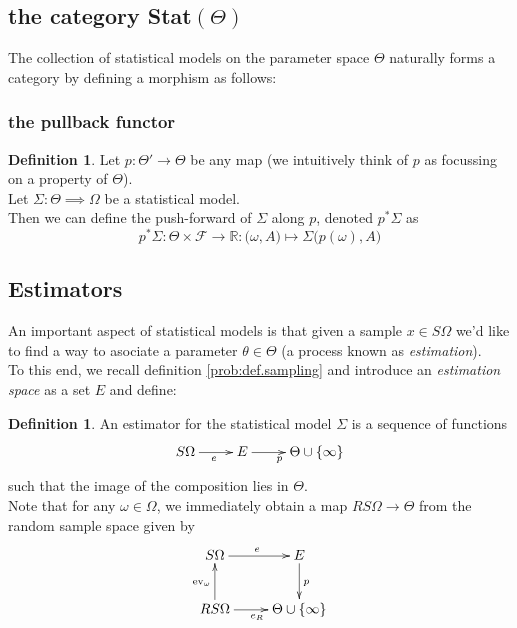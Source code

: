 \documentclass{book}
\theoremstyle{plain}
\theoremstyle{definition}
\newtheorem{definition}[corollary]{Definition}
\renewcommand{\d}[1]{\mathbb{#1}}
\newcommand{\fun}{\mapsto}
\DeclareMathOperator{\ev}{ev}
\newcommand{\mor}{\longrightarrow}
\renewcommand{\r}[1]{\mathcal{#1}}
\begin{document}
\subsection{the category Stat$(\Theta)$}
The collection of statistical models on  the parameter space $\Theta$ naturally forms a category by defining a morphism as follows:



\subsubsection{the pullback functor}

\begin{definition}
Let $p:\Theta'\mor \Theta$ be any map (we intuitively think of $p$ as focussing on a  property of $\Theta$).\\
Let $\Sigma: \Theta\implies \Omega$ be a statistical model.\\
Then we can define the push-forward of $\Sigma$ along $p$, denoted $p^*\Sigma$ as 
\[
p^*\Sigma: \Theta\times \r{F}\mor \d{R}: \big(\omega,A)\fun \Sigma\big(p(\omega), A\big)
\]
\end{definition}



\subsection{Estimators}

\noindent An important aspect of statistical models is that given a sample $x \in S\Omega$ we'd like to find a way to asociate a parameter $\theta \in \Theta$ (a process known as \emph{estimation}).\\
To this end, we  recall definition \ref{prob:def.sampling} and introduce an \emph{estimation space} as a set $E$ and define:

\begin{definition}\label{stats:def.estimators}
An estimator for the statistical model $\Sigma$ is a sequence of functions
\begin{displaymath}
\xymatrix{
S\Omega\ar[r]_{e} & E\ar[r]_p  & \Theta \cup \{\infty\}
}
\end{displaymath}
such that the image of the composition lies in $\Theta$.\\
Note that for any $\omega \in \Omega$, we immediately obtain a map $RS\Omega\mor \Theta$ from the random sample space given by
\begin{displaymath}
\xymatrix{
S\ar[r]^e\Omega & E\ar[d]^p\\
RS\ar[u]^{\ev_{\omega}}\ar[r]_{e_R}\Omega & \Theta\cup\{ \infty \}
}
\end{displaymath}
\end{definition}
\end{document}
